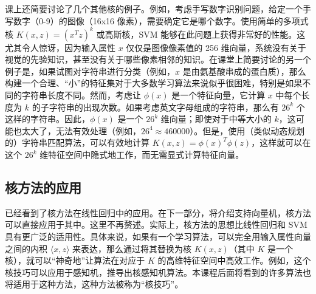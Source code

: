 课上还简要讨论了几个其他核的例子。例如，考虑手写数字识别问题，给定一个手写数字（0-9）的图像（16x16 像素），需要确定它是哪个数字。使用简单的多项式核 $K(x, z) = (x^T z)^k$ 或高斯核，SVM 能够在此问题上获得非常好的性能。这尤其令人惊讶，因为输入属性 $x$ 仅仅是图像像素值的 256 维向量，系统没有关于视觉的先验知识，甚至没有关于哪些像素相邻的知识。在课堂上简要讨论的另一个例子是，如果试图对字符串进行分类（例如，$x$ 是由氨基酸串成的蛋白质），那么构建一个合理、“小”的特征集对于大多数学习算法来说似乎很困难，特别是如果不同的字符串长度不同。然而，考虑让 $\phi(x)$ 是一个特征向量，它计算 $x$ 中每个长度为 $k$ 的子字符串的出现次数。如果考虑英文字母组成的字符串，那么有 $26^k$ 个这样的字符串。因此，$\phi(x)$ 是一个 $26^k$ 维向量；即使对于中等大小的 $k$，这可能也太大了，无法有效处理（例如，$26^4 \approx 460000$）。但是，使用（类似动态规划的）字符串匹配算法，可以有效地计算 $K(x, z) = \phi(x)^T \phi(z)$，这样就可以在这个 $26^k$ 维特征空间中隐式地工作，而无需显式计算特征向量。



\subsection*{核方法的应用}

已经看到了核方法在线性回归中的应用。在下一部分，将介绍支持向量机，核方法可以直接应用于其中。这里不再赘述。实际上，核方法的思想比线性回归和 SVM 具有更广泛的适用性。具体来说，如果有一个学习算法，可以完全用输入属性向量之间的内积 $\langle x, z \rangle$ 来表达，那么通过将其替换为核 $K(x, z)$（其中 $K$ 是一个核），就可以“神奇地”让算法在对应于 $K$ 的高维特征空间中高效工作。例如，这个核技巧可以应用于感知机，推导出核感知机算法。本课程后面将看到的许多算法也将适用于这种方法，这种方法被称为“核技巧”。